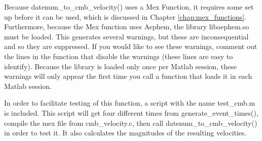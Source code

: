 \documentclass[12pt]{report}
\begin{document}
Because datenum\_to\_cmb\_velocity() uses a Mex Function, it requires some set up before it can be used, which is discussed in Chapter \ref{chap:mex_functions}.  Furthermore, because the Mex function uses Aephem, the library libaephem.so must be loaded.  This generates several warnings, but these are inconsequential and so they are suppressed.  If you would like to see these warnings, comment out the lines in the function that disable the warnings (these lines are easy to identify).  Because the library is loaded only once per Matlab session, these warnings will only appear the first time you call a function that loads it in each Matlab session.

In order to facilitate testing of this function, a script with the name test\_cmb.m is included.  This script will get four different times from generate\_event\_times(), compile the mex file from cmb\_velocity.c, then call datenum\_to\_cmb\_velocity() in order to test it.  It also calculates the magnitudes of the resulting velocities.
\end{document}
